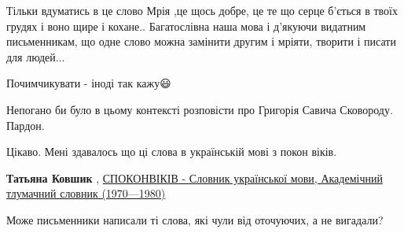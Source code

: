 \begin{itemize}
Тільки вдуматись в це слово Мрія ,це щось добре, це те що серце б'ється в твоїх
грудях і воно щире і кохане.. Багатослівна наша мова і д'якуючи видатним
письменникам, що одне слово можна замінити другим і мріяти, творити і писати для
людей...


 
Почимчикувати - іноді так кажу😃

 
Непогано би було в цьому контексті розповісти про Григорія Савича Сковороду. Пардон.

 
Цікаво. Мені здавалось що ці слова в українській мові з покон віків.

\begin{itemize}
 
\textbf{Татьяна Ковшик} ,
\href{http://sum.in.ua/s/spokonvikiv}{%
СПОКОНВІКІВ - Словник української мови, Академічний тлумачний словник (1970—1980)%
}
\end{itemize}

 
Може письменники написали ті слова, які чули від оточуючих, а не вигадали?

 

\end{itemize}
